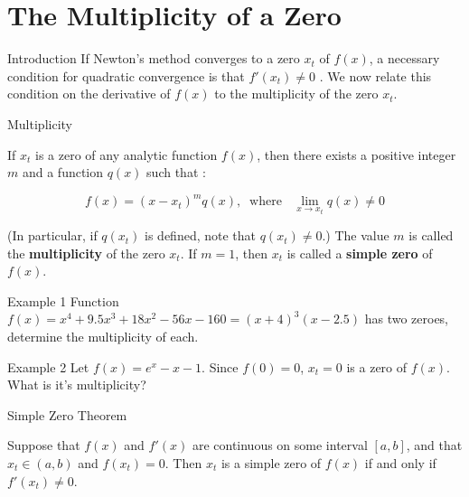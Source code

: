 \documentclass[12pt]{beamer}
\begin{document}
\section{The Multiplicity of a Zero} 

\begin{frame}{Introduction} 
If Newton's method converges to a zero $x_t$ of $f(x)$, a necessary
condition for quadratic convergence is that $f'(x_t) \neq 0$ . We now
relate this condition on the derivative of $f(x)$ to the multiplicity
of the zero $x_t$.

\end{frame} 

\begin{frame}{Multiplicity} 

\begin{theorem} 
If $x_t$ is a zero of any analytic function $f(x)$, then there exists a
positive integer $m$ and a function $q(x)$ such that : 

\[
f(x)=(x - x_t)^mq(x),\;\;\mbox{where } \;\; \lim_{x \rightarrow x_t} q(x) \neq 0
\] 
\end{theorem} 

(In particular, if $q(x_t)$ is defined, note that $q(x_t ) \neq 0$.) The
value $m$ is called the {\bf multiplicity} of the zero $x_t$. If $m=1$, then 
$x_t$ is called a {\bf simple zero} of $f(x)$. 
\end{frame} 

\begin{frame}{Example 1} 
Function $f(x) = x^4 + 9.5 x^3 + 18 x^2 - 56x - 160 = (x+4)^3(x-2.5) $ has two zeroes, determine the multiplicity of each.

\vspace{2 in}
\end{frame} 

\begin{frame}{Example 2} 
Let $f(x) = e^x - x - 1$. Since $f(0)=0$, $x_t =0$ is a zero of $f(x)$. What is it's multiplicity?
\vspace{3 in}
\end{frame} 

\begin{frame}{Simple Zero Theorem} 

\begin{theorem} 
Suppose that $f(x)$ and $f'(x)$ are continuous on some interval $[a, b]$, 
and that $x_t \in (a,b)$ and $f(x_t)=0$. Then $x_t$ is a simple zero of $f(x)$ 
if and only if $f'(x_t) \neq 0$. 
\end{theorem} 
\end{frame} 
\end{document}
